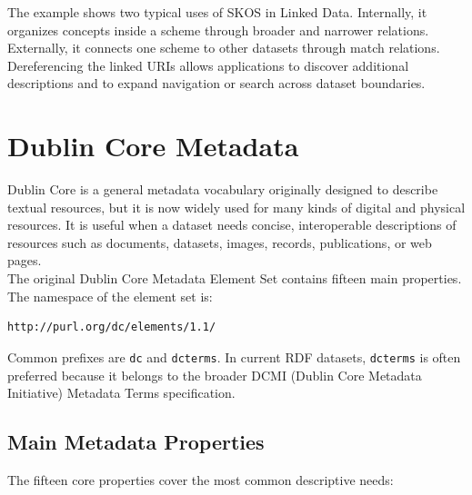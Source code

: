 \documentclass{scrbook}
\begin{document}
	The example shows two typical uses of SKOS in Linked Data. Internally, it organizes concepts inside a scheme through broader and narrower relations. Externally, it connects one scheme to other datasets through match relations. Dereferencing the linked URIs allows applications to discover additional descriptions and to expand navigation or search across dataset boundaries.
	
	\section{Dublin Core Metadata}
	
	Dublin Core is a general metadata vocabulary originally designed to describe textual resources, but it is now widely used for many kinds of digital and physical resources. It is useful when a dataset needs concise, interoperable descriptions of resources such as documents, datasets, images, records, publications, or web pages.\\
	
	The original Dublin Core Metadata Element Set contains fifteen main properties. The namespace of the element set is:
	
	\begin{lstlisting}
http://purl.org/dc/elements/1.1/
	\end{lstlisting}
	
	Common prefixes are \texttt{dc} and \texttt{dcterms}. In current RDF datasets, \texttt{dcterms} is often preferred because it belongs to the broader DCMI (Dublin Core Metadata Initiative) Metadata Terms specification.
	
	\subsection{Main Metadata Properties}
	
	The fifteen core properties cover the most common descriptive needs:
	
\end{document}
